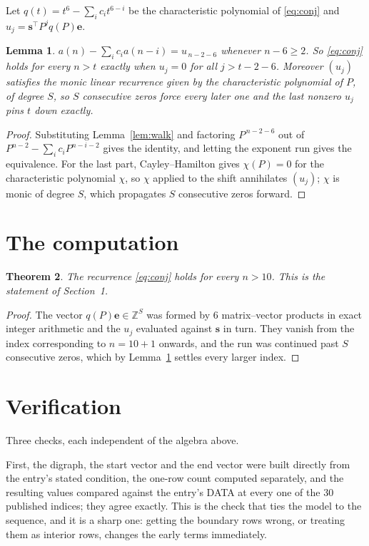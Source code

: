 \documentclass[11pt,a4paper]{article}
\theoremstyle{plain}
\newtheorem{theorem}{Theorem}
\newtheorem{lemma}[theorem]{Lemma}
\theoremstyle{definition}
\begin{document}
Let $q(t)=t^{6}-\sum_i c_i t^{6-i}$ be the characteristic polynomial of
\eqref{eq:conj} and $u_j=\mathbf{s}^{\!\top}P^{j}q(P)\mathbf{e}$.

\begin{lemma}\label{lem:crit}
$a(n)-\sum_i c_i a(n-i)=u_{\,n-2-6}$ whenever $n-6\ge2$. So \eqref{eq:conj}
holds for every $n>t$ exactly when $u_j=0$ for all $j>t-2-6$. Moreover $(u_j)$
satisfies the monic linear recurrence given by the characteristic polynomial of $P$, of
degree $S$, so $S$ consecutive zeros force every later one and the last nonzero $u_j$ pins
$t$ down exactly.
\end{lemma}

\begin{proof}
Substituting Lemma~\ref{lem:walk} and factoring $P^{\,n-2-6}$ out of
$P^{n-2}-\sum_i c_i P^{n-i-2}$ gives the identity, and letting the exponent run gives the
equivalence. For the last part, Cayley--Hamilton gives $\chi(P)=0$ for the characteristic
polynomial $\chi$, so $\chi$ applied to the shift annihilates $(u_j)$; $\chi$ is monic of
degree $S$, which propagates $S$ consecutive zeros forward.
\end{proof}

\section{The computation}

\begin{theorem}
The recurrence \eqref{eq:conj} holds for every $n>10$. This is the statement of
Section~1.
\end{theorem}

\begin{proof}
The vector $q(P)\mathbf{e}\in\mathbb{Z}^{S}$ was formed by $6$ matrix--vector
products in exact integer arithmetic and the $u_j$ evaluated against $\mathbf{s}$ in turn.
They vanish from the index corresponding to $n=10+1$ onwards, and the run was continued
past $S$ consecutive zeros, which by Lemma~\ref{lem:crit} settles every larger index.
\end{proof}

\section{Verification}

Three checks, each independent of the algebra above.

First, the digraph, the start vector and the end vector were built directly from the
entry's stated condition, the one-row count computed separately, and the resulting values
compared against the entry's DATA at every one of the $30$ published indices; they
agree exactly. This is the check that ties the model to the sequence, and it is a sharp one:
getting the boundary rows wrong, or treating them as interior rows, changes the early terms
immediately.
\end{document}
